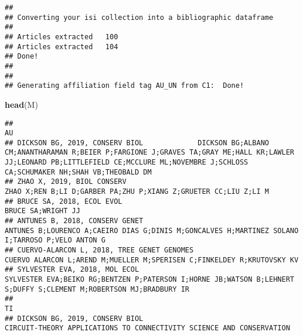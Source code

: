 \documentclass[]{article}
\newenvironment{Shaded}{\begin{snugshade}}{\end{snugshade}}
\newcommand{\KeywordTok}[1]{\textcolor[rgb]{0.13,0.29,0.53}{\textbf{#1}}}
\newcommand{\NormalTok}[1]{#1}
\begin{document}
\begin{verbatim}
## 
## Converting your isi collection into a bibliographic dataframe
## 
## Articles extracted   100 
## Articles extracted   104 
## Done!
## 
## 
## Generating affiliation field tag AU_UN from C1:  Done!
\end{verbatim}

\begin{Shaded}
\begin{Highlighting}[]
\KeywordTok{head}\NormalTok{(M)}
\end{Highlighting}
\end{Shaded}

\begin{verbatim}
##                                                                                                                                                                                                                                AU
## DICKSON BG, 2019, CONSERV BIOL             DICKSON BG;ALBANO CM;ANANTHARAMAN R;BEIER P;FARGIONE J;GRAVES TA;GRAY ME;HALL KR;LAWLER JJ;LEONARD PB;LITTLEFIELD CE;MCCLURE ML;NOVEMBRE J;SCHLOSS CA;SCHUMAKER NH;SHAH VB;THEOBALD DM
## ZHAO X, 2019, BIOL CONSERV                                                                                                                                        ZHAO X;REN B;LI D;GARBER PA;ZHU P;XIANG Z;GRUETER CC;LIU Z;LI M
## BRUCE SA, 2018, ECOL EVOL                                                                                                                                                                                      BRUCE SA;WRIGHT JJ
## ANTUNES B, 2018, CONSERV GENET                                                                                                    ANTUNES B;LOURENCO A;CAEIRO DIAS G;DINIS M;GONCALVES H;MARTINEZ SOLANO I;TARROSO P;VELO ANTON G
## CUERVO-ALARCON L, 2018, TREE GENET GENOMES                                                                                                                 CUERVO ALARCON L;AREND M;MUELLER M;SPERISEN C;FINKELDEY R;KRUTOVSKY KV
## SYLVESTER EVA, 2018, MOL ECOL                                                                                  SYLVESTER EVA;BEIKO RG;BENTZEN P;PATERSON I;HORNE JB;WATSON B;LEHNERT S;DUFFY S;CLEMENT M;ROBERTSON MJ;BRADBURY IR
##                                                                                                                                                                                                            TI
## DICKSON BG, 2019, CONSERV BIOL                                                                                                           CIRCUIT-THEORY APPLICATIONS TO CONNECTIVITY SCIENCE AND CONSERVATION

\end{verbatim}
\end{document}
